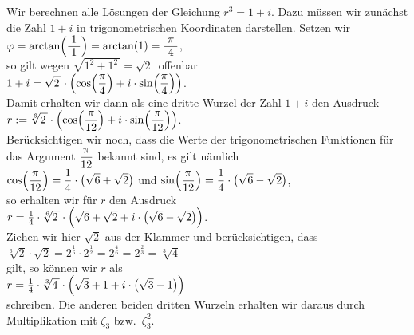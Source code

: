 \example Wir berechnen alle Lösungen der Gleichung $r^3 = 1 + i$.  Dazu müssen wir zunächst die Zahl $1 +
i$ in trigonometrischen Koordinaten darstellen.  Setzen wir
\\[0.2cm]
\hspace*{1.3cm} $\varphi = \arctan\Bigl(\bruch{1}{1}\Bigr) = \arctan(1) = \bruch{\pi}{4}$,
\\[0.2cm]
so gilt wegen $\sqrt{1^2 + 1^2\,} = \sqrt{2\,}$ offenbar
\\[0.2cm]
\hspace*{1.3cm} $\displaystyle1 + i = \sqrt{2\,} \cdot \left(\cos\Bigl(\frac{\pi}{4}\Bigr) + i \cdot \sin\Bigl(\frac{\pi}{4}\Bigr)\right)$.
\\[0.2cm]
Damit erhalten wir dann als eine dritte Wurzel der Zahl $1 + i$ den Ausdruck
\\[0.2cm]
\hspace*{1.3cm}
$\displaystyle r := \sqrt[6]{2\,} \cdot 
      \left(\cos\Bigl(\frac{\pi}{12}\Bigr) + i \cdot \sin\Bigl(\frac{\pi}{12}\Bigr)\right) 
$.
\\[0.2cm]
Berücksichtigen wir noch, dass die Werte der trigonometrischen Funktionen für das Argument
$\displaystyle\frac{\pi}{12}$ bekannt sind, es gilt nämlich
\\[0.2cm]
\hspace*{1.3cm} 
$\displaystyle\cos\Bigl(\frac{\pi}{12}\Bigr) = \frac{1}{4} \cdot \bigl(\sqrt{6} + \sqrt{2}\bigr)$ \quad und \quad
$\displaystyle\sin\Bigl(\frac{\pi}{12}\Bigr) = \frac{1}{4} \cdot \bigl(\sqrt{6} - \sqrt{2}\bigr)$,
\\[0.2cm]
so erhalten wir für $r$ den Ausdruck
\\[0.2cm]
\hspace*{1.3cm}
$r = \frac{1}{4} \cdot \sqrt[6]{2\,} \cdot
     \Bigl(\sqrt{6} + \sqrt{2} + i \cdot \bigl(\sqrt{6} - \sqrt{2}\bigr)\Bigr) 
$.
\\[0.2cm]
Ziehen wir hier $\sqrt{2}$ aus der Klammer und berücksichtigen, dass
\\[0.2cm]
\hspace*{1.3cm}
$\sqrt[6]{2} \cdot \sqrt{2} = 2^{\frac{1}{6}} \cdot 2^{\frac{1}{2}} =
 2^{\frac{4}{6}} =  2^{\frac{2}{3}} = \sqrt[3]{4}
$
\\[0.2cm]
gilt, so können wir $r$ als
\\[0.2cm]
\hspace*{1.3cm}
$r = \frac{1}{4} \cdot \sqrt[3]{4\,} \cdot \Bigl(\sqrt{3} + 1 + i \cdot \bigl(\sqrt{3} - 1\bigr)\Bigr)$
\\[0.2cm]
schreiben.  Die anderen beiden dritten Wurzeln erhalten wir daraus durch Multiplikation mit
$\zeta_3$ bzw.~$\zeta_3^2$.

